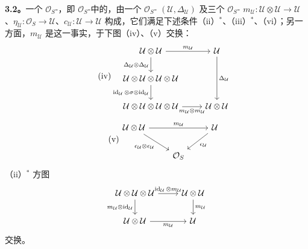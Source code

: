 \textbf{3.2。}一个 $\mathcal O_S$-，即 $\mathcal O_S$-中的，由一个 $\mathcal O_S$- $(\mathcal U,\Delta_{\mathcal U})$ 及三个 $\mathcal O_S$- $m_{\mathcal U}:\mathcal U\otimes\mathcal U\to\mathcal U$、$\eta_{\mathcal U}:\mathcal O_S\to\mathcal U$、$c_{\mathcal U}:\mathcal U\to\mathcal U$ 构成，它们满足下述条件（ii）$^*$、（iii）$^*$、（vi）；另一方面，$m_{\mathcal U}$ 是这一事实，于下图（iv）、（v）交换：
\[
\tag{iv}
\begin{tikzcd}
\mathcal U\otimes\mathcal U\arrow[r,"m_{\mathcal U}"]\arrow[d,"\Delta_{\mathcal U}\otimes\Delta_{\mathcal U}"']&\mathcal U\arrow[dd,"\Delta_{\mathcal U}"]\\
\mathcal U\otimes\mathcal U\otimes\mathcal U\otimes\mathcal U\arrow[d,"\operatorname{id}_{\mathcal U}\otimes\sigma\otimes\operatorname{id}_{\mathcal U}"']&\\
\mathcal U\otimes\mathcal U\otimes\mathcal U\otimes\mathcal U\arrow[r,"m_{\mathcal U}\otimes m_{\mathcal U}"']&\mathcal U\otimes\mathcal U
\end{tikzcd}
\]
\[
\tag{v}
\begin{tikzcd}
\mathcal U\otimes\mathcal U\arrow[rr,"m_{\mathcal U}"]\arrow[dr,"\epsilon_{\mathcal U}\otimes\epsilon_{\mathcal U}"']&&\mathcal U\arrow[dl,"\epsilon_{\mathcal U}"]\\
&\mathcal O_S&
\end{tikzcd}
\]
（ii）$^*$ 方图
\[
\begin{tikzcd}
\mathcal U\otimes\mathcal U\otimes\mathcal U\arrow[r,"\operatorname{id}_{\mathcal U}\otimes m_{\mathcal U}"]\arrow[d,"m_{\mathcal U}\otimes\operatorname{id}_{\mathcal U}"']&\mathcal U\otimes\mathcal U\arrow[d,"m_{\mathcal U}"]\\
\mathcal U\otimes\mathcal U\arrow[r,"m_{\mathcal U}"']&\mathcal U
\end{tikzcd}
\]
交换。


